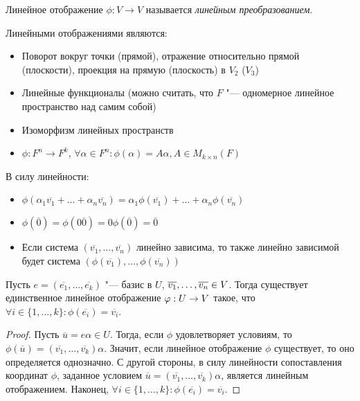 \begin{definition}
	Линейное отображение $\phi: V \rightarrow V$ называется \textit{линейным преобразованием}.
\end{definition}

\begin{example}
	Линейными отображениями являются:
	\begin{itemize}
		\item Поворот вокруг точки (прямой), отражение относительно прямой (плоскости), проекция на прямую (плоскость) в $V_2$ ($V_3$)
		\item Линейные функционалы (можно считать, что $F$ "--- одномерное линейное пространство над самим собой)
		\item Изоморфизм линейных пространств
		\item $\phi: F^n \rightarrow F^k$, $\forall \alpha \in F^n: \phi(\alpha) = A\alpha, A \in M_{k \times n}(F)$
	\end{itemize}
\end{example}

\begin{note}
	В силу линейности:
	\begin{itemize}
		\item $\phi(\alpha_1\overline{v_1} + \dots + \alpha_n\overline{v_n}) = \alpha_1\phi(\overline{v_1}) + \dots + \alpha_n\phi(\overline{v_n})$
		\item $\phi(\overline{0}) = \phi(0\overline{0}) = 0\phi(\overline{0}) = \overline{0}$
		\item Если система $(\overline{v_1}, \dots, \overline{v_n})$ линейно зависима, то также линейно зависимой будет система $(\phi(\overline{v_1}), \dots, \phi(\overline{v_n}))$
	\end{itemize}
\end{note}

\begin{proposition}
	Пусть $e = (\overline{e_1}, \dots, \overline{e_k})$ "--- базис в $U$, $\overline{v_1}, \dots, \overline{v_n} \hm{\in} V$. Тогда существует единственное линейное отображение $\phi: U \hm{\rightarrow} V$ такое, что $\forall i \in \{1, \dots, k\}: \phi(\overline{e_i}) = \overline{v_i}$.
\end{proposition}

\begin{proof}
	Пусть $\overline{u} = e\alpha \in U$. Тогда, если $\phi$ удовлетворяет условиям, то $\phi(\overline{u}) = (\overline{v_1}, \dots, \overline{v_k})\alpha$. Значит, если линейное отображение $\phi$ существует, то оно определяется однозначно. С другой стороны, в силу линейности сопоставления координат $\phi$, заданное условием $\overline{u} = (\overline{v_1}, \dots, \overline{v_k})\alpha$, является линейным отображением. Наконец, $\forall i \in \{1, \dots, k\}: \phi(\overline{e_i}) = \overline{v_i}$.
\end{proof}

